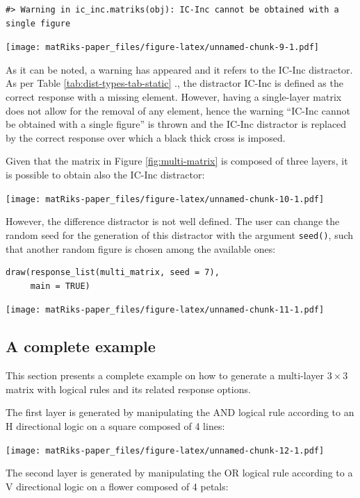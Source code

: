 \begin{verbatim}
#> Warning in ic_inc.matriks(obj): IC-Inc cannot be obtained with a single figure
\end{verbatim}

\texttt{[image: matRiks-paper\_files/figure-latex/unnamed-chunk-9-1.pdf]}

As it can be noted, a warning has appeared and it refers to the IC-Inc distractor.
As per Table \ref{tab:dist-types-tab-static} ., the distractor IC-Inc is defined as the correct response with a missing element.
However, having a single-layer matrix does not allow for the removal of any element, hence the warning ``IC-Inc cannot be obtained with a single figure'' is thrown and the IC-Inc distractor is replaced by the correct response over which a black thick cross is imposed.

Given that the matrix in Figure \ref{fig:multi-matrix} is composed of three layers, it is possible to obtain also the IC-Inc distractor:

\texttt{[image: matRiks-paper\_files/figure-latex/unnamed-chunk-10-1.pdf]}

However, the difference distractor is not well defined.
The user can change the random seed for the generation of this distractor with the argument \texttt{seed()}, such that another random figure is chosen among the available ones:

\begin{verbatim}
draw(response_list(multi_matrix, seed = 7), 
     main = TRUE)
\end{verbatim}

\texttt{[image: matRiks-paper\_files/figure-latex/unnamed-chunk-11-1.pdf]}

\subsection{A complete example}\label{a-complete-example}

This section presents a complete example on how to generate a multi-layer \(3 \times 3\) matrix with logical rules and its related response options.

The first layer is generated by manipulating the AND logical rule according to an H directional logic on a square composed of 4 lines:

\texttt{[image: matRiks-paper\_files/figure-latex/unnamed-chunk-12-1.pdf]}

The second layer is generated by manipulating the OR logical rule according to a V directional logic on a flower composed of 4 petals:

